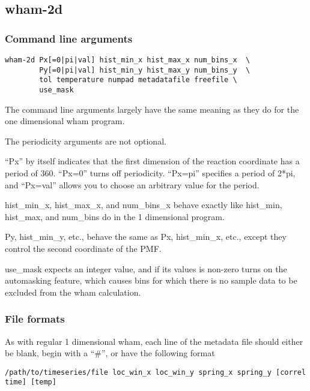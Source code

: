 \documentclass[12pt]{article}
\begin{document}
\subsection{wham-2d}

\subsubsection{Command line arguments}

\begin{verbatim}
wham-2d Px[=0|pi|val] hist_min_x hist_max_x num_bins_x  \
        Py[=0|pi|val] hist_min_y hist_max_y num_bins_y  \
        tol temperature numpad metadatafile freefile \ 
        use_mask
\end{verbatim}

The command line arguments largely have the same meaning as they do for the
one dimensional wham program.

The periodicity arguments are not optional.

``Px'' by itself indicates that the first dimension of the reaction coordinate
has a period of 360.  ``Px=0'' turns off periodicity.  ``Px=pi'' specifies a
period of 2*pi, and ``Px=val'' allows you to choose an arbitrary value for
the period.

hist\_min\_x, hist\_max\_x, and num\_bins\_x behave exactly like hist\_min,
hist\_max, and num\_bins do in the 1 dimensional program.

Py, hist\_min\_y, etc., behave the same as Px, hist\_min\_x, etc., except they
control the second coordinate of the PMF.

use\_mask expects an integer value, and if its values is non-zero turns on
the automasking feature, which causes bins for which there is no sample data
to be excluded from the wham calculation.

\subsubsection{File formats}

As with regular 1 dimensional wham, each line of the metadata file should
either be blank, begin with a ``\#'', or have the following format

\begin{footnotesize}
\begin{verbatim}
/path/to/timeseries/file loc_win_x loc_win_y spring_x spring_y [correl time] [temp]
\end{verbatim}
\end{footnotesize}
\end{document}
